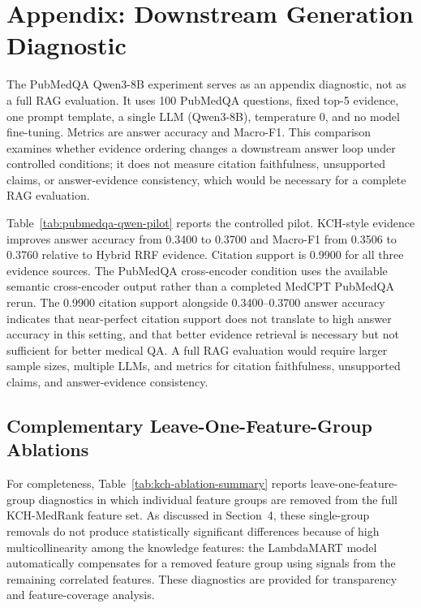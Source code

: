 \section{Appendix: Downstream Generation Diagnostic}
\label{sec:appendix-generation}

The PubMedQA Qwen3-8B experiment serves as an appendix diagnostic, not as a full RAG evaluation. It uses 100 PubMedQA questions, fixed top-5 evidence, one prompt template, a single LLM (Qwen3-8B), temperature 0, and no model fine-tuning. Metrics are answer accuracy and Macro-F1. This comparison examines whether evidence ordering changes a downstream answer loop under controlled conditions; it does not measure citation faithfulness, unsupported claims, or answer-evidence consistency, which would be necessary for a complete RAG evaluation.

Table~\ref{tab:pubmedqa-qwen-pilot} reports the controlled pilot. KCH-style evidence improves answer accuracy from 0.3400 to 0.3700 and Macro-F1 from 0.3506 to 0.3760 relative to Hybrid RRF evidence. Citation support is 0.9900 for all three evidence sources. The PubMedQA cross-encoder condition uses the available semantic cross-encoder output rather than a completed MedCPT PubMedQA rerun. The 0.9900 citation support alongside 0.3400--0.3700 answer accuracy indicates that near-perfect citation support does not translate to high answer accuracy in this setting, and that better evidence retrieval is necessary but not sufficient for better medical QA. A full RAG evaluation would require larger sample sizes, multiple LLMs, and metrics for citation faithfulness, unsupported claims, and answer-evidence consistency.



\subsection{Complementary Leave-One-Feature-Group Ablations}

For completeness, Table~\ref{tab:kch-ablation-summary} reports leave-one-feature-group diagnostics in which individual feature groups are removed from the full KCH-MedRank feature set. As discussed in Section~4, these single-group removals do not produce statistically significant differences because of high multicollinearity among the knowledge features: the LambdaMART model automatically compensates for a removed feature group using signals from the remaining correlated features. These diagnostics are provided for transparency and feature-coverage analysis.

